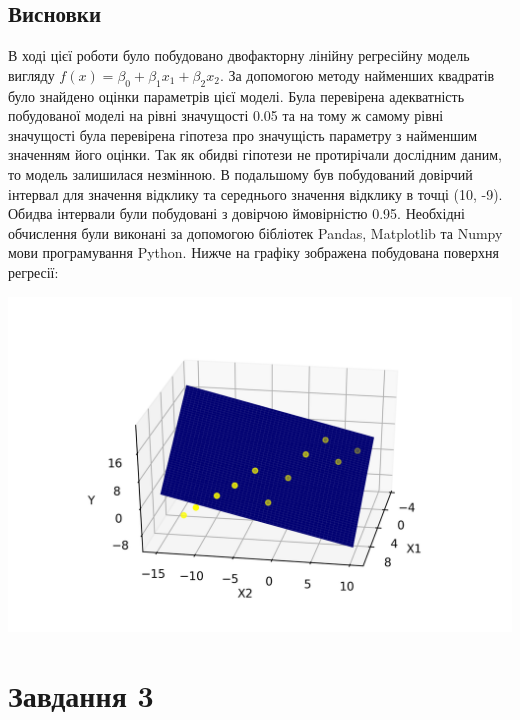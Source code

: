 \documentclass{article}
\begin{document}
    \subsection{Висновки}
      В ході цієї роботи було побудовано двофакторну лінійну регресійну модель вигляду 
      $f(x) = \beta_0 + \beta_1 x_1 + \beta_2 x_2$. За допомогою методу найменших 
      квадратів було знайдено оцінки параметрів цієї моделі. Була перевірена 
      адекватність побудованої моделі на рівні значущості 0.05 та на тому ж самому 
      рівні значущості була перевірена гіпотеза про значущість параметру з 
      найменшим значенням його оцінки. Так як обидві гіпотези не протирічали 
      дослідним даним, то модель залишилася незмінною. В подальшому був побудований 
      довірчий інтервал для значення відклику та середнього значення відклику 
      в точці (10, -9). Обидва інтервали були побудовані з довірчою ймовірністю 0.95.
      Необхідні обчислення були виконані за допомогою бібліотек Pandas, Matplotlib та 
      Numpy мови програмування Python. Нижче на графіку зображена побудована поверхня 
      регресії:
      \begin{center}
        \includegraphics[scale=0.85]{task2_fin.png}
      \end{center}
  \newpage
  \section{Завдання 3}
\end{document}
